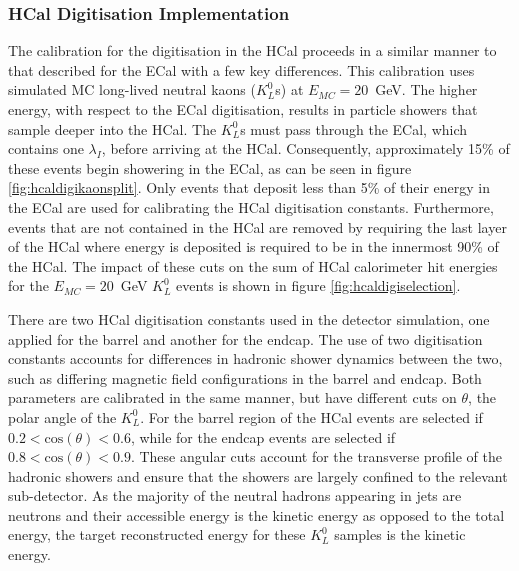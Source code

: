 
\subsubsection{HCal Digitisation Implementation}
\label{sec:hcaldigi}
The calibration for the digitisation in the HCal proceeds in a similar manner to that described for the ECal with a few key differences.  This calibration uses simulated MC long-lived neutral kaons ($K^{0}_{L}$s) at $E_{MC} = 20$~GeV.  The higher energy, with respect to the ECal digitisation, results in particle showers that sample deeper into the HCal.  The $K^{0}_{L}$s must pass through the ECal, which contains one $\lambda_{I}$, before arriving at the HCal.  Consequently, approximately 15\% of these events begin showering in the ECal, as can be seen in figure \ref{fig:hcaldigikaonsplit}.  Only events that deposit less than 5\% of their energy in the ECal are used for calibrating the HCal digitisation constants.  Furthermore, events that are not contained in the HCal are removed by requiring the last layer of the HCal where energy is deposited is required to be in the innermost 90\% of the HCal.  The impact of these cuts on the sum of HCal calorimeter hit energies for the $E_{MC} = 20$~GeV $K^{0}_{L}$ events is shown in figure \ref{fig:hcaldigiselection}.  

There are two HCal digitisation constants used in the detector simulation, one applied for the barrel and another for the endcap.  The use of two digitisation constants accounts for differences in hadronic shower dynamics between the two, such as differing magnetic field configurations in the barrel and endcap.  Both parameters are calibrated in the same manner, but have different cuts on $\theta$, the polar angle of the $K^{0}_{L}$.  For the barrel region of the HCal events are selected if $0.2 < \text{cos}(\theta) < 0.6$, while for the endcap events are selected if $0.8 < \text{cos}(\theta) < 0.9$.  These angular cuts account for the transverse profile of the hadronic showers and ensure that the showers are largely confined to the relevant sub-detector.  As the majority of the neutral hadrons appearing in jets are neutrons and their accessible energy is the kinetic energy as opposed to the total energy, the target reconstructed energy for these $K^{0}_{L}$ samples is the kinetic energy.  

